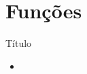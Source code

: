 \section{Funções}

\begin{frame}[fragile]{Título}

    \begin{itemize}
        \item
    \end{itemize}

\end{frame}
